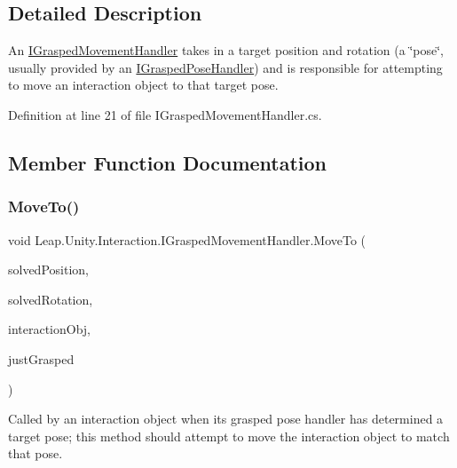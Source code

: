 \subsection{Detailed Description}
An \mbox{\hyperlink{interface_leap_1_1_unity_1_1_interaction_1_1_i_grasped_movement_handler}{I\+Grasped\+Movement\+Handler}} takes in a target position and rotation (a \char`\"{}pose\char`\"{}, usually provided by an \mbox{\hyperlink{interface_leap_1_1_unity_1_1_interaction_1_1_i_grasped_pose_handler}{I\+Grasped\+Pose\+Handler}}) and is responsible for attempting to move an interaction object to that target pose. 



Definition at line 21 of file I\+Grasped\+Movement\+Handler.\+cs.



\subsection{Member Function Documentation}
\mbox{\label{interface_leap_1_1_unity_1_1_interaction_1_1_i_grasped_movement_handler_a49da4845ba5c20aa1ff075745b634c78}} 
\subsubsection{\texorpdfstring{MoveTo()}{MoveTo()}}
{\footnotesize\ttfamily void Leap.\+Unity.\+Interaction.\+I\+Grasped\+Movement\+Handler.\+Move\+To (\begin{DoxyParamCaption}\item[{Vector3}]{solved\+Position,  }\item[{Quaternion}]{solved\+Rotation,  }\item[{\mbox{\hyperlink{class_leap_1_1_unity_1_1_interaction_1_1_interaction_behaviour}{Interaction\+Behaviour}}}]{interaction\+Obj,  }\item[{bool}]{just\+Grasped }\end{DoxyParamCaption})}



Called by an interaction object when its grasped pose handler has determined a target pose; this method should attempt to move the interaction object to match that pose. 



